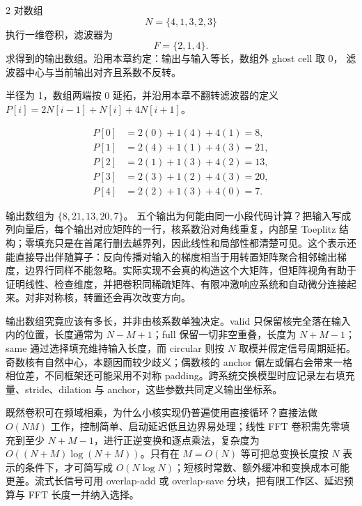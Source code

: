 \begin{solutionexercise}{2}
\problemheading 对数组
\[
  N=\{4,1,3,2,3\}
\]
执行一维卷积，滤波器为
\[
  F=\{2,1,4\}.
\]
求得到的输出数组。沿用本章约定：输出与输入等长，数组外 ghost cell 取 0，
滤波器中心与当前输出对齐且系数不反转。

\approachheading 半径为 1，数组两端按 0 延拓，并沿用本章不翻转滤波器的定义
$P[i]=2N[i-1]+N[i]+4N[i+1]$。

\answerheading
\[
\begin{aligned}
P[0]&=2(0)+1(4)+4(1)=8,\\
P[1]&=2(4)+1(1)+4(3)=21,\\
P[2]&=2(1)+1(3)+4(2)=13,\\
P[3]&=2(3)+1(2)+4(3)=20,\\
P[4]&=2(2)+1(3)+4(0)=7.
\end{aligned}
\]

\conclusionheading 输出数组为 $\{8,21,13,20,7\}$。
\discussionheading
{}
五个输出为何能由同一小段代码计算？把输入写成列向量后，每个输出对应矩阵的一行，核系数沿对角线重复，内部呈 Toeplitz 结构；零填充只是在首尾行删去越界列，因此线性和局部性都清楚可见。这个表示还能直接导出伴随算子：反向传播对输入的梯度相当于用转置矩阵聚合相邻输出梯度，边界行同样不能忽略。实际实现不会真的构造这个大矩阵，但矩阵视角有助于证明线性、检查维度，并把卷积同稀疏矩阵、有限冲激响应系统和自动微分连接起来。对非对称核，转置还会再次改变方向。

输出数组究竟应该有多长，并非由核系数单独决定。valid 只保留核完全落在输入内的位置，长度通常为 $N-M+1$；full 保留一切非空重叠，长度为 $N+M-1$；same 通过选择填充维持输入长度，而 circular 则按 $N$ 取模并假定信号周期延拓。奇数核有自然中心，本题因而较少歧义；偶数核的 anchor 偏左或偏右会带来一格相位差，不同框架还可能采用不对称 padding。跨系统交换模型时应记录左右填充量、stride、dilation 与 anchor，这些参数共同定义输出坐标系。

既然卷积可在频域相乘，为什么小核实现仍普遍使用直接循环？直接法做 $O(NM)$ 工作，控制简单、启动延迟低且边界易处理；线性 FFT 卷积需先零填充到至少 $N+M-1$，进行正逆变换和逐点乘法，复杂度为 $O((N+M)\log(N+M))$。只有在 $M=O(N)$ 等可把总变换长度按 $N$ 表示的条件下，才可简写成 $O(N\log N)$；短核时常数、额外缓冲和变换成本可能更差。流式长信号可用 overlap-add 或 overlap-save 分块，把有限工作区、延迟预算与 FFT 长度一并纳入选择。


\end{solutionexercise}
